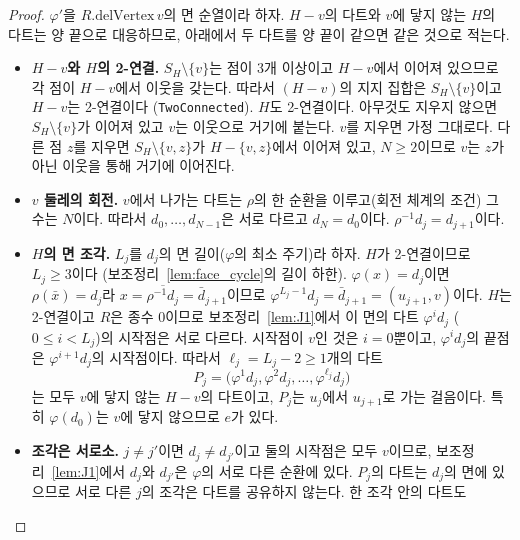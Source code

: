 \begin{proof}
\leanok
\(\varphi'\)을 \(R.\mathrm{delVertex}\,v\)의 면 순열이라 하자. \(H - v\)의 다트와 \(v\)에 닿지 않는 \(H\)의 다트는
양 끝으로 대응하므로, 아래에서 두 다트를 양 끝이 같으면 같은 것으로 적는다.
\begin{itemize}
  \item \textbf{\(H - v\)와 \(H\)의 2-연결.} \(S_H \setminus \{v\}\)는 점이 3개 이상이고 \(H - v\)에서
        이어져 있으므로 각 점이 \(H - v\)에서 이웃을 갖는다. 따라서 \((H - v)\)의 지지 집합은
        \(S_H \setminus \{v\}\)이고 \(H - v\)는 2-연결이다 (\texttt{TwoConnected}).
        \(H\)도 2-연결이다. 아무것도 지우지 않으면 \(S_H \setminus \{v\}\)가 이어져 있고 \(v\)는 이웃으로 거기에
        붙는다. \(v\)를 지우면 가정 그대로다. 다른 점 \(z\)를 지우면 \(S_H \setminus \{v, z\}\)가 \(H - \{v, z\}\)에서
        이어져 있고, \(N \ge 2\)이므로 \(v\)는 \(z\)가 아닌 이웃을 통해 거기에 이어진다.
  \item \textbf{\(v\) 둘레의 회전.} \(v\)에서 나가는 다트는 \(\rho\)의 한 순환을 이루고(회전 체계의 조건)
        그 수는 \(N\)이다. 따라서 \(d_0, \ldots, d_{N-1}\)은 서로 다르고 \(d_N = d_0\)이다.
        \(\rho^{-1} d_j = d_{j+1}\)이다.
  \item \textbf{\(H\)의 면 조각.} \(L_j\)를 \(d_j\)의 면 길이(\(\varphi\)의 최소 주기)라 하자.
        \(H\)가 2-연결이므로 \(L_j \ge 3\)이다 (보조정리~\ref{lem:face_cycle}의 길이 하한).
        \(\varphi(x) = d_j\)이면 \(\rho(\bar x) = d_j\)라 \(x = \overline{\rho^{-1} d_j} = \bar d_{j+1}\)이므로
        \(\varphi^{L_j - 1} d_j = \bar d_{j+1} = (u_{j+1}, v)\)이다. \(H\)는 2-연결이고 \(R\)은 종수 0이므로
        보조정리~\ref{lem:J1}에서 이 면의 다트 \(\varphi^i d_j\) (\(0 \le i < L_j\))의 시작점은 서로 다르다.
        시작점이 \(v\)인 것은 \(i = 0\)뿐이고, \(\varphi^i d_j\)의 끝점은 \(\varphi^{i+1} d_j\)의 시작점이다.
        따라서 \(\ell_j = L_j - 2 \ge 1\)개의 다트
        \[
          P_j = \bigl(\varphi^{1} d_j, \varphi^{2} d_j, \ldots, \varphi^{\ell_j} d_j\bigr)
        \]
        는 모두 \(v\)에 닿지 않는 \(H - v\)의 다트이고, \(P_j\)는 \(u_j\)에서 \(u_{j+1}\)로 가는 걸음이다.
        특히 \(\varphi(d_0)\)는 \(v\)에 닿지 않으므로 \(e\)가 있다.
  \item \textbf{조각은 서로소.} \(j \ne j'\)이면 \(d_j \ne d_{j'}\)이고 둘의 시작점은 모두 \(v\)이므로,
        보조정리~\ref{lem:J1}에서 \(d_j\)와 \(d_{j'}\)은 \(\varphi\)의 서로 다른 순환에 있다. \(P_j\)의 다트는
        \(d_j\)의 면에 있으므로 서로 다른 \(j\)의 조각은 다트를 공유하지 않는다. 한 조각 안의 다트도

\end{itemize}
\end{proof}
